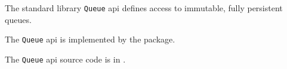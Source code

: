 
The standard library {\tt Queue} api defines access to immutable, fully persistent queues.

The {\tt Queue} api is implemented by the  package.

The {\tt Queue} api source code is in .





